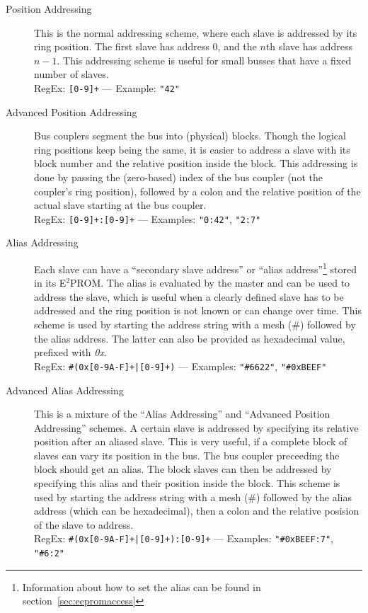 \documentclass[a4paper,12pt,BCOR6mm,bibtotoc,idxtotoc]{scrbook}
\begin{document}
\begin{description}
\item[Position Addressing] This is the normal addressing scheme, where
  each slave is addressed by its ring position. The first slave has
  address 0, and the $n$th slave has address $n - 1$. This addressing
  scheme is useful for small busses that have a fixed number of slaves.\\
  RegEx: \texttt{[0-9]+} --- Example: \texttt{"42"}
\item[Advanced Position Addressing] Bus couplers segment the bus into
  (physical) blocks. Though the logical ring positions keep being the
  same, it is easier to address a slave with its block number and the
  relative position inside the block. This addressing is done by
  passing the (zero-based) index of the bus coupler (not the coupler's
  ring position), followed by a colon and the relative position of the
  actual slave starting at the bus coupler.\\
  RegEx: \texttt{[0-9]+:[0-9]+} --- Examples: \texttt{"0:42"},
  \texttt{"2:7"}
\item[Alias Addressing] Each slave can have a ``secondary slave
  address'' or ``alias address''\footnote{Information about how to set
    the alias can be found in section~\ref{sec:eepromaccess}} stored
  in its E$^2$PROM.  The alias is evaluated by the master and can be
  used to address the slave, which is useful when a clearly defined
  slave has to be addressed and the ring position is not known or can
  change over time. This scheme is used by starting the address string
  with a mesh (\#) followed by the alias address.  The latter can also
  be provided as hexadecimal value, prefixed with \textit{0x}.\\
  RegEx: \texttt{\#(0x[0-9A-F]+|[0-9]+)} --- Examples:
  \texttt{"\#6622"}, \texttt{"\#0xBEEF"}
\item[Advanced Alias Addressing] This is a mixture of the ``Alias
  Addressing'' and ``Advanced Position Addressing'' schemes. A certain
  slave is addressed by specifying its relative position after an
  aliased slave. This is very useful, if a complete block of slaves
  can vary its position in the bus. The bus coupler preceeding the
  block should get an alias. The block slaves can then be addressed by
  specifying this alias and their position inside the block. This
  scheme is used by starting the address string with a mesh (\#)
  followed by the alias address (which can be hexadecimal), then a
  colon and the relative posision of the slave to
  address.\\
  RegEx: \texttt{\#(0x[0-9A-F]+|[0-9]+):[0-9]+} --- Examples:
  \texttt{"\#0xBEEF:7"}, \texttt{"\#6:2"}
\end{description}
\end{document}
